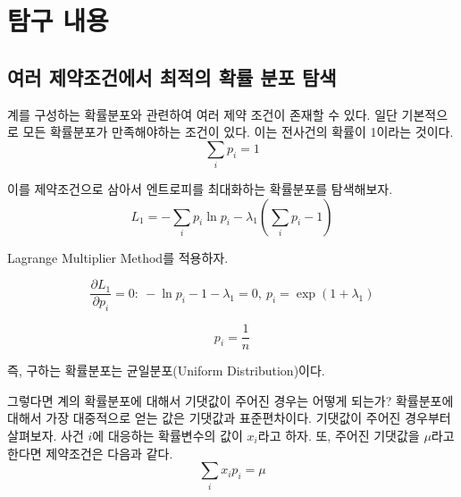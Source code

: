 \section{탐구 내용}

\subsection{여러 제약조건에서 최적의 확률 분포 탐색}

계를 구성하는 확률분포와 관련하여 여러 제약 조건이 존재할 수 있다. 일단 기본적으로 모든 확률분포가 만족해야하는 조건이 있다. 이는 전사건의 확률이 1이라는 것이다.
\begin{equation}
    \sum_{i} p_{i} = 1
    \label{Constraint1}
\end{equation}

이를 제약조건으로 삼아서 엔트로피를 최대화하는 확률분포를 탐색해보자.
\begin{equation}
    L_{1} = -\sum_{i} p_{i} \ln{p_{i}} - \lambda_{1} ( \sum_{i} p_{i} - 1)
    \label{L_I}
\end{equation}

Lagrange Multiplier Method를 적용하자.

\begin{equation}
    \frac{\partial L_{1}}{\partial p_{i}} = 0:~ -\ln{p_{i}} - 1 - \lambda_{1} = 0, ~p_{i} = \exp{(1+\lambda_{1})}
    \label{Lagrange_I}
\end{equation}

\begin{equation}
    p_{i} = \frac{1}{n}
    \label{p_I}
\end{equation}

즉, 구하는 확률분포는 균일분포(Uniform Distribution)이다. 


그렇다면 계의 확률분포에 대해서 기댓값이 주어진 경우는 어떻게 되는가? 확률분포에 대해서 가장 대중적으로 얻는 값은 기댓값과 표준편차이다. 기댓값이 주어진 경우부터 살펴보자. 사건 $i$에 대응하는 확률변수의 값이 $x_{i}$라고 하자. 또, 주어진 기댓값을 $\mu$라고 한다면 제약조건은 다음과 같다.
\begin{equation}
    \sum_{i} x_{i}p_{i} = \mu
    \label{Constraint2}
\end{equation}


